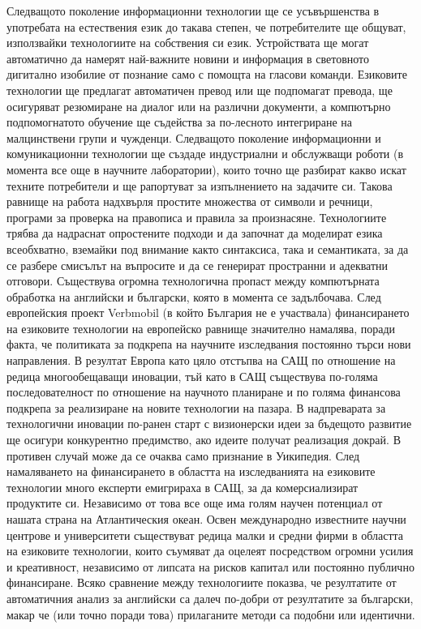 \begin{multicols}{2}
Следващото поколение информационни технологии ще се усъвършенства в употребата на естествения език до такава степен, че потребителите ще общуват, използвайки технологиите на собствения си език. Устройствата ще могат автоматично да намерят най-важните новини и информация в световното дигитално изобилие от познание само с помощта на гласови команди. Езиковите технологии ще предлагат автоматичен превод или ще подпомагат превода, ще осигуряват резюмиране на диалог или на различни документи, а компютърно подпомогнатото обучение ще съдейства за по-лесното интегриране на малцинствени групи и чужденци. 
Следващото поколение информационни и комуникационни технологии ще създаде индустриални и обслужващи роботи (в момента все още в научните лаборатории), които точно ще разбират какво искат техните потребители и ще рапортуват за изпълнението на задачите си. Такова равнище на работа надхвърля простите множества от символи и речници, програми за проверка на правописа и правила за произнасяне. Технологиите трябва да надраснат опростените подходи и да започнат да моделират езика всеобхватно, вземайки под внимание както синтаксиса, така и семантиката, за да се разбере смисълът на въпросите и да се генерират пространни и адекватни отговори.
Съществува огромна технологична пропаст между компютърната обработка на английски и български, която в момента се задълбочава. След европейския проект Verbmobil (в който България не е участвала) финансирането на езиковите технологии на европейско равнище значително намалява, поради факта, че политиката за  подкрепа на научните изследвания постоянно търси нови направления. В резултат Европа като цяло отстъпва на САЩ по отношение на редица многообещаващи иновации, тъй като в САЩ съществува по-голяма последователност по отношение на научното планиране и по голяма финансова подкрепа за реализиране на новите технологии на пазара.
В надпреварата за технологични иновации по-ранен старт с визионерски идеи за бъдещото развитие ще осигури конкурентно предимство, ако идеите получат реализация докрай. В противен случай може да се очаква само признание в Уикипедия. След намаляването на финансирането в областта на изследванията на езиковите технологии много експерти емигрираха в САЩ, за да комерсиализират продуктите си. Независимо от това все още има голям научен потенциал от нашата страна на Атлантическия океан.
Освен международно известните научни центрове и университети съществуват редица малки и средни фирми в областта на езиковите технологии, които съумяват да оцелеят посредством огромни усилия и креативност, независимо от липсата на рисков капитал или постоянно публично финансиране. Всяко сравнение между технологиите  показва, че резултатите от автоматичния анализ за английски са далеч по-добри от резултатите за български, макар че (или точно поради това) прилаганите методи са подобни или идентични.

\end{multicols}
